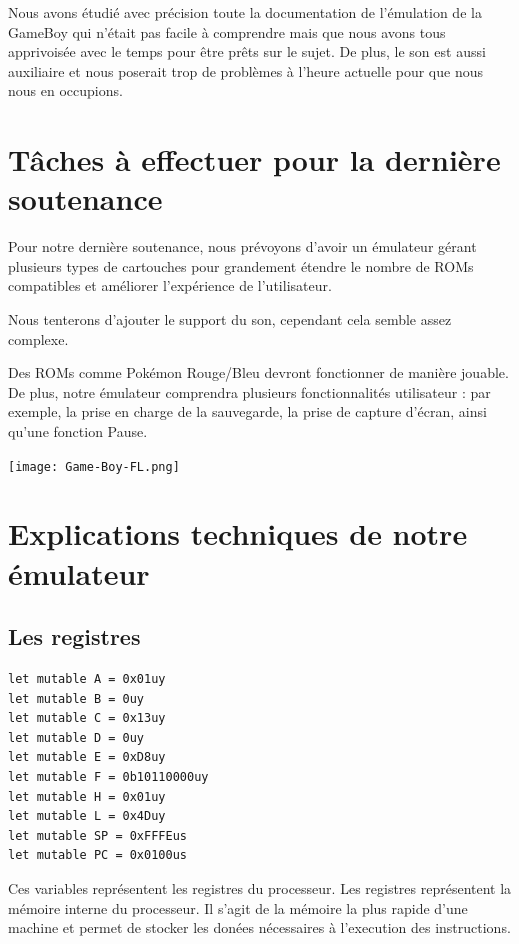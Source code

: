 \documentclass[12pt, a4paper]{article}
\begin{document}
\bigskip
Nous avons étudié avec précision toute la documentation de l'émulation de la GameBoy qui n'était pas facile à comprendre mais que nous avons tous apprivoisée avec le temps pour être prêts sur le sujet. De plus, le son est aussi auxiliaire et nous poserait trop de problèmes à l'heure actuelle pour que nous nous en occupions.


\pagebreak

\section{Tâches à effectuer pour la dernière soutenance}

Pour notre dernière soutenance, nous prévoyons d'avoir un émulateur gérant plusieurs types de cartouches pour grandement étendre le nombre de ROMs compatibles et améliorer l'expérience de l'utilisateur.

\bigskip
Nous tenterons d'ajouter le support du son, cependant cela semble assez complexe.

\bigskip
Des ROMs comme Pokémon Rouge/Bleu devront fonctionner de manière jouable. De plus, notre émulateur comprendra plusieurs fonctionnalités utilisateur : par exemple, la prise en charge de la sauvegarde, la prise de capture d'écran, ainsi qu'une fonction Pause.


\bigskip
\begin{center}
\texttt{[image: Game-Boy-FL.png]}
\end{center}

\pagebreak

\section{Explications techniques de notre émulateur}

\subsection{Les registres}
\small \begin{lstlisting}[frame=single]
let mutable A = 0x01uy
let mutable B = 0uy
let mutable C = 0x13uy
let mutable D = 0uy
let mutable E = 0xD8uy
let mutable F = 0b10110000uy
let mutable H = 0x01uy
let mutable L = 0x4Duy
let mutable SP = 0xFFFEus
let mutable PC = 0x0100us
\end{lstlisting}
\large
\bigskip
Ces variables représentent les registres du processeur. Les registres représentent la mémoire interne du processeur. Il s'agit de la mémoire la plus rapide d'une machine et permet de stocker les donées nécessaires à l'execution des instructions.
\end{document}
